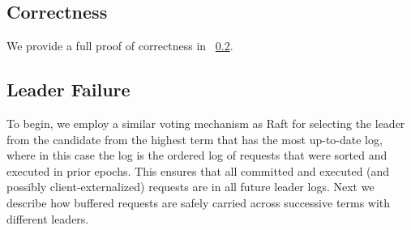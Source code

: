 

\subsection{Correctness}
We provide a full proof of correctness in ~\ref{}.

\subsection{Leader Failure}
To begin, we employ a similar voting mechanism as Raft for selecting the leader from the candidate from the highest term that has the most up-to-date log, where in this case the log is the ordered log of requests that were sorted and executed in prior epochs. This ensures that all committed and executed (and possibly client-externalized) requests are in all future leader logs. Next we describe how buffered requests are safely carried across successive terms with different leaders.

